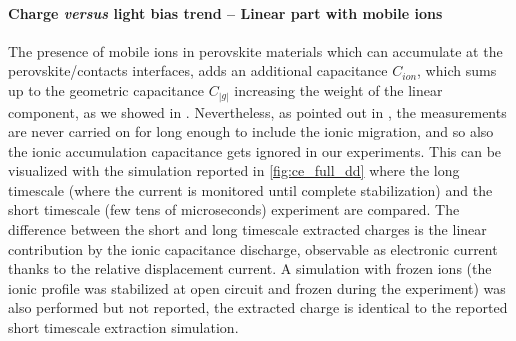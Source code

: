 		\paragraph{Charge \textit{versus} light bias trend -- Linear part with mobile ions}
		The presence of mobile ions in perovskite materials which can accumulate at the perovskite/contacts interfaces, adds an additional capacitance $C_{ion}$, which sums up to the geometric capacitance $C_|g|$ increasing the weight of the linear component, as we showed in .
		Nevertheless, as pointed out in , the  measurements are never carried on for long enough to include the ionic migration, and so also the ionic accumulation capacitance gets ignored in our experiments.
		This can be visualized with the simulation reported in \cref{fig:ce_full_dd} where the long timescale (where the current is monitored until complete stabilization) and the short timescale (few tens of microseconds)  experiment are compared.
		The difference between the short and long timescale extracted charges is the linear contribution by the ionic capacitance discharge, observable as electronic current thanks to the relative displacement current.
		A simulation with frozen ions (the ionic profile was stabilized at open circuit and frozen during the  experiment) was also performed but not reported, the extracted charge is identical to the reported short timescale extraction simulation.
		
			\begin{figure}%
	\end{figure}

